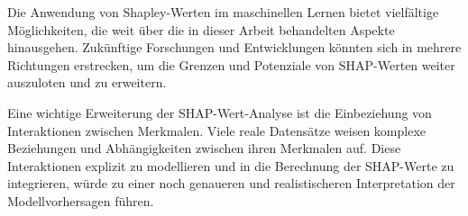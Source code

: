 Die Anwendung von Shapley-Werten im maschinellen Lernen bietet vielfältige Möglichkeiten, die weit über die in dieser Arbeit behandelten Aspekte hinausgehen. 
Zukünftige Forschungen und Entwicklungen könnten sich in mehrere Richtungen erstrecken, um die Grenzen und Potenziale von SHAP-Werten weiter auszuloten und zu erweitern.

Eine wichtige Erweiterung der SHAP-Wert-Analyse ist die Einbeziehung von Interaktionen zwischen Merkmalen. Viele reale Datensätze weisen 
komplexe Beziehungen und Abhängigkeiten zwischen ihren Merkmalen auf. Diese Interaktionen explizit zu modellieren und in die Berechnung der SHAP-Werte zu integrieren, 
würde zu einer noch genaueren und realistischeren Interpretation der Modellvorhersagen führen.

